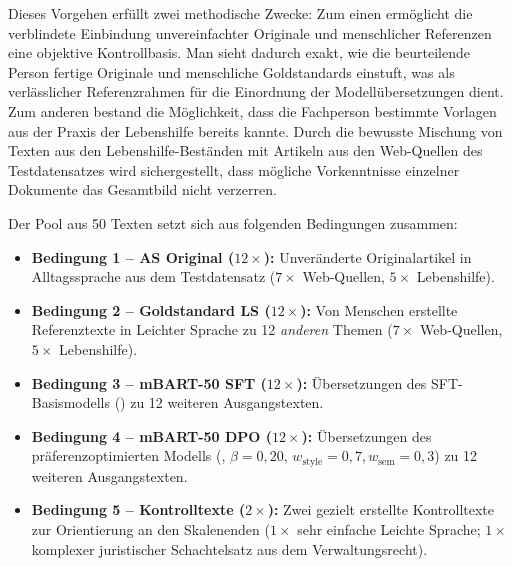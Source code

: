 Dieses Vorgehen erfüllt zwei methodische Zwecke: Zum einen ermöglicht die verblindete Einbindung unvereinfachter Originale und menschlicher Referenzen eine objektive Kontrollbasis. Man sieht dadurch exakt, wie die beurteilende Person fertige Originale und menschliche Goldstandards einstuft, was als verlässlicher Referenzrahmen für die Einordnung der Modellübersetzungen dient. Zum anderen bestand die Möglichkeit, dass die Fachperson bestimmte Vorlagen aus der Praxis der Lebenshilfe bereits kannte. Durch die bewusste Mischung von Texten aus den Lebenshilfe-Beständen mit Artikeln aus den Web-Quellen des Testdatensatzes wird sichergestellt, dass mögliche Vorkenntnisse einzelner Dokumente das Gesamtbild nicht verzerren.

Der Pool aus 50 Texten setzt sich aus folgenden Bedingungen zusammen:
\begin{itemize}
    \item \textbf{Bedingung 1 -- AS Original ($12\times$):} Unveränderte Originalartikel in Alltagssprache aus dem Testdatensatz ($7\times$ Web-Quellen, $5\times$ Lebenshilfe).
    \item \textbf{Bedingung 2 -- Goldstandard LS ($12\times$):} Von Menschen erstellte Referenztexte in Leichter Sprache zu 12 \textit{anderen} Themen ($7\times$ Web-Quellen, $5\times$ Lebenshilfe).
    \item \textbf{Bedingung 3 -- mBART-50 SFT ($12\times$):} Übersetzungen des SFT-Basismodells () zu 12 weiteren Ausgangstexten.
    \item \textbf{Bedingung 4 -- mBART-50 DPO ($12\times$):} Übersetzungen des präferenzoptimierten Modells (, $\beta=0{,}20$, $w_{\text{style}}=0{,}7, w_{\text{sem}}=0{,}3$) zu 12 weiteren Ausgangstexten.
    \item \textbf{Bedingung 5 -- Kontrolltexte ($2\times$):} Zwei gezielt erstellte Kontrolltexte zur Orientierung an den Skalenenden ($1\times$ sehr einfache Leichte Sprache; $1\times$ komplexer juristischer Schachtelsatz aus dem Verwaltungsrecht).
\end{itemize}

